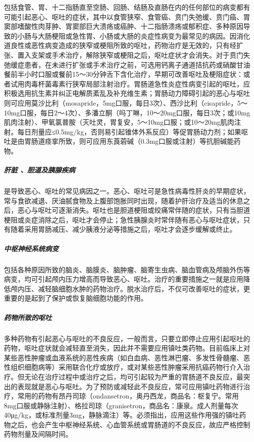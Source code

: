 包括食管、胃、十二指肠直至空肠、回肠、结肠及直肠在内的任何部位的病变都有可能引起恶心、呕吐的症状，其中以食管狭窄、食管癌、贲门失弛缓、贲门癌、胃窦部嗜酸性肉芽肿、胃窦部巨大溃疡或癌肿、十二指肠溃疡或郁积症、多种原因导致的小肠与大肠梗阻或急性胃、小肠或大肠的炎症性病变为最常见的病因。因消化道良性或恶性病变造成的狭窄或梗阻所致的呕吐，药物治疗是无效的，只有经扩张、置入支架或手术治疗，解除狭窄或梗阻之后，呕吐症状才会消失。对于贲门失弛缓症患者，在未进行扩张或手术治疗之前，可选用钙离子通道拮抗药或硝酸甘油餐前半小时口服或餐前15～30分钟舌下含化治疗，早期可改善呕吐及梗阻症状：或者试用肉毒杆菌毒素行狭窄局部注射治疗。胃肠道急性炎症性病变引起的呕吐，应积极选用抗生素并纠正电解质紊乱及补充维生素；胃肠动力障碍引起的恶心与呕吐则可应用莫沙比利（mosapride，5mg口服，每日3次）、西沙比利（cisapride，5～10mg口服，每日2～4次）、多潘立酮（吗丁啉，10～20mg口服，每日3次；或10mg肌肉注射）、甲氧氯普胺（灭吐灵，胃复安，5～10mg口服；或10～20mg肌肉注射。每日剂量应≤0.5mg/kg，否则易引起锥体外系反应）等促胃肠动力剂；如果呕吐是由胃肠道痉挛所致，则可应用东莨菪碱（0.3mg口服或注射）等抗胆碱能药物。

\subparagraph{肝脏 、胆道及胰腺疾病}

是导致恶心、呕吐的常见病因之一。恶心、呕吐可是急性病毒性肝炎的早期症状，常与食欲减退、厌油腻食物及上腹部饱胀同时出现，随着护肝治疗及适当的休息之后，恶心与呕吐可逐渐消失。呕吐也是胆道梗阻或绞痛常伴随的症状，只有当胆道梗阻或炎症消除之后，呕吐才会停止；急性胰腺炎时常伴随有恶心与呕吐症状，只有随着采用胃肠减压、减少胰液分泌等措施之后，呕吐才会逐步缓解或终止。

\subparagraph{中枢神经系统病变}

包括各种原因所致的脑炎、脑膜炎、脑肿瘤、脑寄生虫病、脑血管病及颅脑外伤等病变，均可引起颅内压力增高而导致恶心、呕吐。治疗的重要措施之一就是应用降低颅内压、减轻脑细胞水肿的药物治疗。脱水治疗后，不仅可改善呕吐的症状，更重要的是起到了保护或恢复脑细胞功能的作用。

\subparagraph{药物所致的呕吐}

多种药物有引起恶心与呕吐的不良反应，一般而言，只要立即停止应用引起呕吐的药物，呕吐症状就会减轻直至消失，因此并不需要应用镇吐类药物。目前临床上对某些恶性肿瘤或血液系统的恶性疾病（如白血病、恶性淋巴瘤、多发性骨髓瘤、恶性组织细胞病等）采用联合化疗或放疗，或对某些恶性肿瘤采用抗癌药物行介入治疗。但无论在治疗过程中或治疗之后，均可引起较为严重的胃肠道不良反应，最突出的表现就是恶心与呕吐。为了预防或减轻此不良反应，常可应用镇吐药物进行治疗，常用的药物有昂丹司琼（ondansetron，奥丹西龙，商品名：枢复宁。常用8mg口服或静脉注射）、格拉司琼（granisetron，商品名：康泉。成人剂量每次40μg/kg，或标准剂量3mg，静脉滴注）等。必须指出，应用这些作用强的镇吐药物之后，也会产生中枢神经系统、心血管系统或胃肠道的不良反应，故应严格控制药物剂量及间隔时间。

